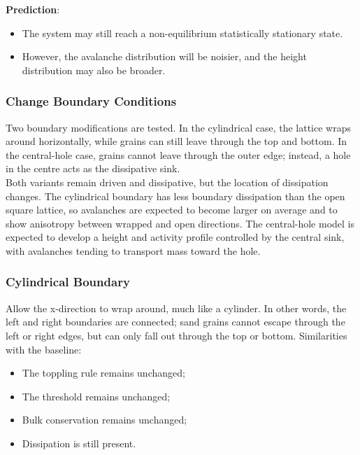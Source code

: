 \documentclass{article}
\begin{document}
\textbf{Prediction}:
\begin{itemize}
    \item The system may still reach a non-equilibrium statistically stationary state. 
    \item However, the avalanche distribution will be noisier, and the height distribution may also be broader.
\end{itemize}

\clearpage

\subsubsection{Change Boundary Conditions}
Two boundary modifications are tested. In the cylindrical case, the lattice wraps around horizontally, while grains can still leave through the top and bottom. In the central-hole case, grains cannot leave through the outer edge; instead, a hole in the centre acts as the dissipative sink.\\

Both variants remain driven and dissipative, but the location of dissipation changes. The cylindrical boundary has less boundary dissipation than the open square lattice, so avalanches are expected to become larger on average and to show anisotropy between wrapped and open directions. The central-hole model is expected to develop a height and activity profile controlled by the central sink, with avalanches tending to transport mass toward the hole.\\

\subsubsection{Cylindrical Boundary}
Allow the x-direction to wrap around, much like a cylinder. In other words, the left and right boundaries are connected; sand grains cannot escape through the left or right edges, but can only fall out through the top or bottom. Similarities with the baseline:

\begin{itemize}
    \item The toppling rule remains unchanged;
    \item The threshold remains unchanged;
    \item Bulk conservation remains unchanged;
    \item Dissipation is still present.
\end{itemize}
\end{document}
